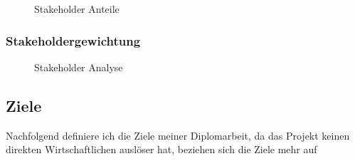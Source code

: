 \begin{figure}[H] 
  \begin{center}  
  \end{center}
  \caption{Stakeholder Anteile}
\end{figure}

  
\newpage

\subsubsection{Stakeholdergewichtung}
\vspace{1cm}
\begin{figure}[H]
    \centering
{}
\caption{Stakeholder Analyse}
\end{figure}
\newpage

\newpage
\subsection{Ziele}
Nachfolgend definiere ich die Ziele meiner Diplomarbeit, da das Projekt keinen direkten Wirtschaftlichen auslöser hat, beziehen sich die Ziele mehr auf 


